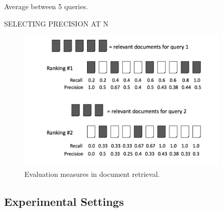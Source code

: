 \documentclass{llncs}
\begin{document}
Average between 5 queries.

SELECTING PRECISION AT N


\begin{figure}[h!]
\centering
\includegraphics[width=0.9\textwidth]{figure/cumulativeGain}
\caption{Evaluation measures in document retrieval.}
\label{fig:namedCumulativeGain}%
\end{figure}

\subsection{Experimental Settings}
\label{sec:experimentalSettings}
\end{document}
